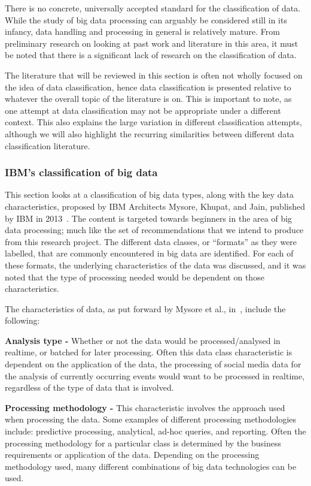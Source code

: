 There is no concrete, universally accepted standard for the classification of data. While the study of big data
processing can arguably be considered still in its infancy, data handling and processing in general is relatively
mature. From preliminary research on looking at past work and literature in this area, it must be noted that there is a
significant lack of research on the classification of data.

The literature that will be reviewed in this section is often not wholly focused on the idea of data classification,
hence data classification is presented relative to whatever the overall topic of the literature is on. This is important
to note, as one attempt at data classification may not be appropriate under a different context. This also explains the
large variation in different classification attempts, although we will also highlight the recurring similarities between
different data classification literature.


\subsubsection{IBM's classification of big data}
\label{ssub:data_charact}

This section looks at a classification of big data types, along with the key data characteristics, proposed by IBM
Architects Mysore, Khupat, and Jain, published by IBM in 2013~\cite{ibm_big_2013}. The content is targeted towards
beginners in the area of big data processing; much like the set of recommendations that we intend to produce from this
research project. The different data classes, or ``formats'' as they were labelled, that are commonly encountered in big
data are identified. For each of these formats, the underlying characteristics of the data was discussed, and it was
noted that the type of processing needed would be dependent on those characteristics.

\noindent The characteristics of data, as put forward by Mysore et al., in~\cite{ibm_big_2013}, include the following:

\noindent \textbf{Analysis type -} Whether or not the data would be processed/analysed in realtime, or batched for later
processing. Often this data class characteristic is dependent on the application of the data, \eg{}the processing of
social media data for the analysis of currently occurring events would want to be processed in realtime, regardless of
the type of data that is involved.

\noindent \textbf{Processing methodology -} This characteristic involves the approach used when processing the data.
Some examples of different processing methodologies include: predictive processing, analytical, ad-hoc queries, and
reporting. Often the processing methodology for a particular class is determined by the business requirements or
application of the data. Depending on the processing methodology used, many different combinations of big data
technologies can be used.

